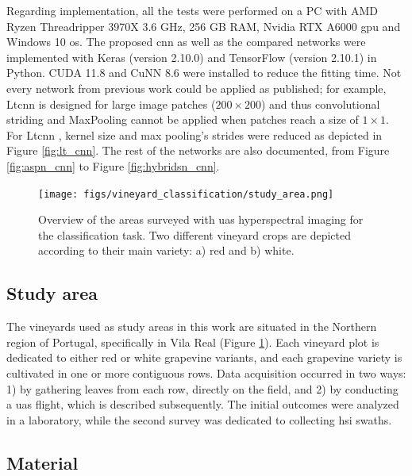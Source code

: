 Regarding implementation, all the tests were performed on a PC with AMD Ryzen Threadripper 3970X 3.6 GHz, 256 GB RAM, Nvidia RTX A6000 \acrshort{gpu} and Windows 10 \acrshort{os}. The proposed \acrshort{cnn} as well as the compared networks were implemented with Keras (version 2.10.0) and TensorFlow (version 2.10.1) in Python. CUDA 11.8 and CuNN 8.6 were installed to reduce the fitting time. Not every network from previous work could be applied as published; for example, Lt\acrshort{cnn} is designed for large image patches ($200\times200$) and thus convolutional striding and MaxPooling cannot be applied when patches reach a size of $1\times1$. For Lt\acrshort{cnn} \cite{lu_hyperspectral_2022}, kernel size and max pooling's strides were reduced as depicted in Figure \ref{fig:lt_cnn}. The rest of the networks are also documented, from Figure \ref{fig:aspn_cnn} to Figure \ref{fig:hybridsn_cnn}.

\begin{figure}[bht]
    \centering
    \texttt{[image: figs/vineyard\_classification/study\_area.png]}
	\caption{Overview of the areas surveyed with \acrshort{uas} hyperspectral imaging for the classification task. Two different vineyard crops are depicted according to their main variety: a) red and b) white. }
	\label{fig:vineyard_study_area}
\end{figure}

\subsection{Study area}

The vineyards used as study areas in this work are situated in the Northern region of Portugal, specifically in Vila Real (Figure \ref{fig:vineyard_study_area}). Each vineyard plot is dedicated to either red or white grapevine variants, and each grapevine variety is cultivated in one or more contiguous rows. Data acquisition occurred in two ways: 1) by gathering leaves from each row, directly on the field, and 2) by conducting a \acrshort{uas} flight, which is described subsequently. The initial outcomes were analyzed in a laboratory, while the second survey was dedicated to collecting \acrshort{hsi} swaths.

\subsection{Material}

